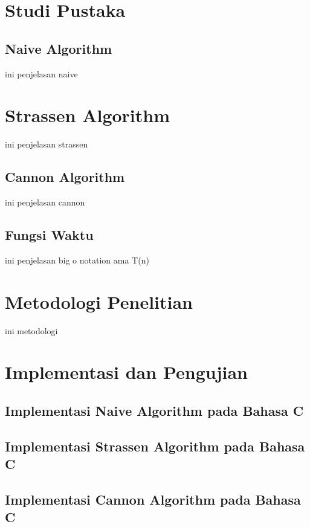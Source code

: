 \documentclass[conference]{IEEEtran}
\begin{document}
{{\section{Studi Pustaka}

\subsection{Naive Algorithm}

ini penjelasan naive

\section{Strassen Algorithm}
ini penjelasan strassen

\subsection{Cannon Algorithm}\label{AA}
ini penjelasan cannon

\subsection{Fungsi Waktu}
ini penjelasan big o notation ama T(n)

\section{Metodologi Penelitian}
ini metodologi



\section{Implementasi dan Pengujian}

\subsection{Implementasi Naive Algorithm pada Bahasa C}

\subsection{Implementasi Strassen Algorithm pada Bahasa C}

\subsection{Implementasi Cannon Algorithm pada Bahasa C}


}}
\end{document}
